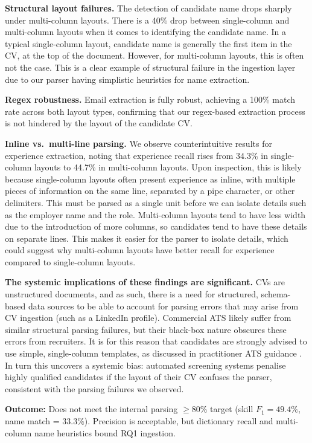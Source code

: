 \textbf{Structural layout failures.} The detection of candidate name drops sharply under multi-column layouts.
There is a 40\% drop between single-column and multi-column layouts when it comes to identifying the candidate name.
In a typical single-column layout, candidate name is generally the first item in the CV, at the top of the document.
However, for multi-column layouts, this is often not the case. This is a clear example of structural failure in the 
ingestion layer due to our parser having simplistic heuristics for name extraction.

\textbf{Regex robustness.} Email extraction is fully robust, achieving a 100\% match rate across both layout types,
confirming that our regex-based extraction process is not hindered by the layout of the candidate CV.

\textbf{Inline vs.\ multi-line parsing.} We observe counterintuitive results for experience extraction, noting that experience recall rises from
34.3\% in single-column layouts to 44.7\% in multi-column layouts. Upon inspection, this is likely because single-column layouts often present experience as inline, with
multiple pieces of information on the same line, separated by a pipe character, or other delimiters. This must
be parsed as a single unit before we can isolate details such as the employer name and the role. Multi-column
layouts tend to have less width due to the introduction of more columns, so candidates tend to have these details on
separate lines. This makes it easier for the parser to isolate details, which could suggest why multi-column
layouts have better recall for experience compared to single-column layouts.

\textbf{The systemic implications of these findings are significant.} CVs are unstructured documents, and as 
such, there is a need for structured, schema-based data sources to be able
to account for parsing errors that may arise from CV ingestion (such as a LinkedIn profile). Commercial ATS likely suffer from similar structural parsing failures, but their black-box nature obscures these errors from recruiters.
It is for this reason that candidates are strongly advised to use simple, single-column templates, as discussed in practitioner ATS guidance \cite{marr2019}.
In turn this uncovers a systemic bias: automated screening systems penalise highly qualified candidates if the
layout of their CV confuses the parser, consistent with the parsing failures we observed.

\textbf{Outcome:} Does not meet the internal parsing $\geq 80\%$ target (skill $F_1 = 49.4\%$, name match = $33.3\%$).
Precision is acceptable, but dictionary recall and multi-column name heuristics bound RQ1 ingestion.

